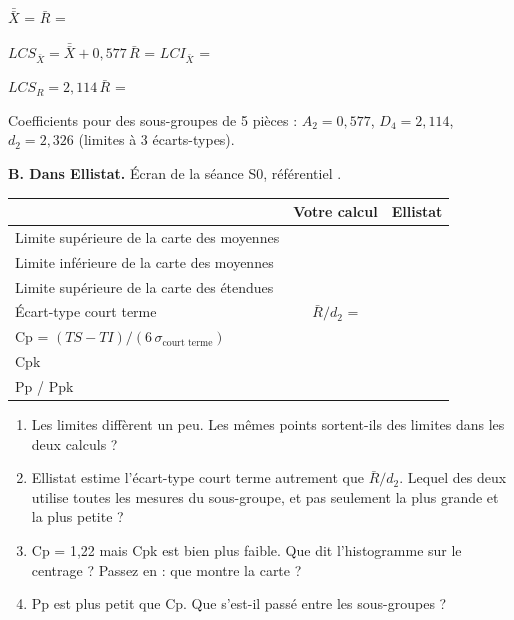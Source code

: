 \documentclass[10pt,a4paper]{article}
\begin{document}
\vspace{3pt}
$\bar{\bar X}$ = \champ{20mm} \qquad $\bar R$ = \champ{20mm}\par\vspace{4pt}
$LCS_{\bar X} = \bar{\bar X} + 0{,}577\,\bar R$ = \champ{20mm} \quad $LCI_{\bar X}$ = \champ{20mm}\par\vspace{4pt}
$LCS_R = 2{,}114\,\bar R$ = \champ{18mm}

{\small Coefficients pour des sous-groupes de 5 pièces : $A_2 = 0{,}577$, $D_4 = 2{,}114$, $d_2 = 2{,}326$ (limites à 3 écarts-types).}

\textbf{B. Dans Ellistat.} Écran  de la séance S0, référentiel .

\renewcommand{\arraystretch}{1.4}
\begin{tabularx}{\linewidth}{|X|c|c|}\hline
 & \textbf{Votre calcul} & \textbf{Ellistat}\\\hline
Limite supérieure de la carte des moyennes & & \\\hline
Limite inférieure de la carte des moyennes & & \\\hline
Limite supérieure de la carte des étendues & & \\\hline
Écart-type court terme & $\bar R / d_2$ = & \\\hline
Cp = $(TS - TI) / (6\,\sigma_{\text{court terme}})$ & & \\\hline
Cpk & & \\\hline
Pp \quad / \quad Ppk & & \\\hline
\end{tabularx}

\begin{enumerate}[label=\textcolor{cyan}{\textbf{Q\arabic*.}},leftmargin=22pt]
\item Les limites diffèrent un peu. Les mêmes points sortent-ils des limites dans les deux calculs ?\reponse
\item Ellistat estime l'écart-type court terme autrement que $\bar R / d_2$. Lequel des deux utilise toutes les mesures du sous-groupe, et pas seulement la plus grande et la plus petite ?\reponse[2]
\item Cp = 1,22 mais Cpk est bien plus faible. Que dit l'histogramme sur le centrage ? Passez en  : que montre la carte ?\reponse[2]
\item Pp est plus petit que Cp. Que s'est-il passé entre les sous-groupes ?\reponse
\end{enumerate}
\end{document}
